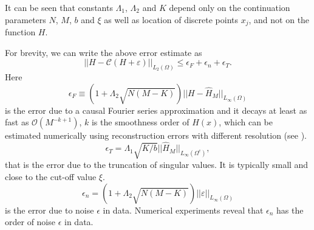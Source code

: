 \documentclass[journal,twoside]{IEEEtran}
\begin{document}
It can be seen that constants $\Lambda_1$,  $\Lambda_2$  and $K$ depend only on the continuation parameters $N$, $M$, $b$ and $\xi$ as well as location of discrete points $x_j$, and not on the function $H$.  

For brevity, we can write the above error estimate 
 as
\[
||H- {\mathcal C}(H+\varepsilon) ||_{L_2(\Omega)} \leq \epsilon_F+\epsilon_n + \epsilon_T.
\]
Here
\[
\epsilon_F\equiv (1+\Lambda_2 \sqrt{N(M-K)}) || H-\hat H_{M} || _{L_\infty(\Omega)} 
\]
is the error due to a causal Fourier series approximation and it decays at least as fast as ${\mathcal O}(M^{-k+1})$, $k$ is the smoothness order of $H(x)$, which can be estimated numerically using reconstruction errors with different resolution (see \cite{Barannyk_Aboutaleb_Elshabini_Barlow_IEEE}).
\[
\epsilon_T=\Lambda_1 \sqrt{K/b} ||\hat H_{M}||_{L_\infty(\Omega^c)},
\]
that is the error due to the truncation of singular values. It is typically small and close to the cut-off value $\xi$.
\[
\epsilon_n=(1+\Lambda_2 \sqrt{N(M-K)}) ||\varepsilon||_{L_\infty(\Omega)} 
\]
is the error due to noise $\epsilon$ in data. Numerical experiments reveal that $\epsilon_n$ has the order of noise $\epsilon$ in data.




\end{document}
